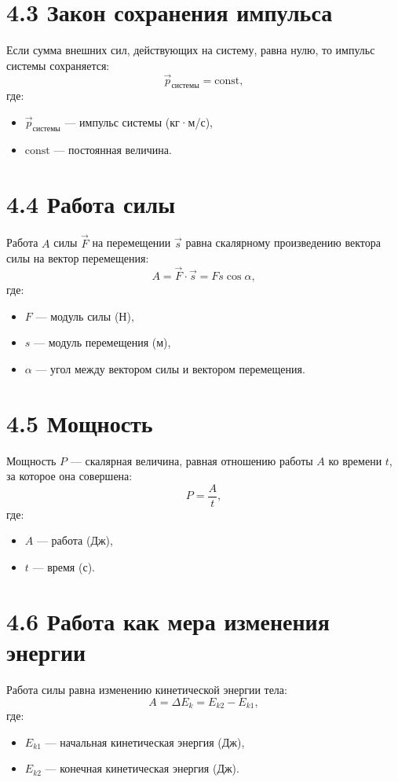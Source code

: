 \documentclass[a4paper,12pt]{article}
\begin{document}
\section*{4.3 Закон сохранения импульса}
Если сумма внешних сил, действующих на систему, равна нулю, то импульс системы сохраняется:
\vspace{-0.3em}
$$\vec{p}_{\text{системы}} = \text{const},$$
где:
\begin{itemize}[itemsep=0pt, topsep=0pt, parsep=0pt]
  \setlength\itemsep{0em}
  \item \(\vec{p}_{\text{системы}}\) — импульс системы (кг·м/с),
  \item \(\text{const}\) — постоянная величина.
\end{itemize}


\section*{4.4 Работа силы}
Работа \(A\) силы \(\vec{F}\) на перемещении \(\vec{s}\) равна скалярному произведению вектора силы на вектор перемещения:
\vspace{-0.3em}
$$A = \vec{F} \cdot \vec{s} = F s \cos \alpha,$$
где:
\begin{itemize}[itemsep=0pt, topsep=0pt, parsep=0pt]
  \setlength\itemsep{0em}
  \item \(F\) — модуль силы (Н),
  \item \(s\) — модуль перемещения (м),
  \item \(\alpha\) — угол между вектором силы и вектором перемещения.
\end{itemize}


\section*{4.5 Мощность}
Мощность \(P\) — скалярная величина, равная отношению работы \(A\) ко времени \(t\), за которое она совершена:
\vspace{-0.3em}
$$P = \frac{A}{t},$$
где:
\begin{itemize}[itemsep=0pt, topsep=0pt, parsep=0pt]
  \item \(A\) — работа (Дж),
  \item \(t\) — время (с).
\end{itemize}


\section*{4.6 Работа как мера изменения энергии}
Работа силы равна изменению кинетической энергии тела:
\vspace{-0.3em}
$$A = \Delta E_k = E_{k2} - E_{k1},$$
где:
\begin{itemize}[itemsep=0pt, topsep=0pt, parsep=0pt]
  \setlength\itemsep{0em}
  \item \(E_{k1}\) — начальная кинетическая энергия (Дж),
  \item \(E_{k2}\) — конечная кинетическая энергия (Дж).
\end{itemize}
\end{document}
